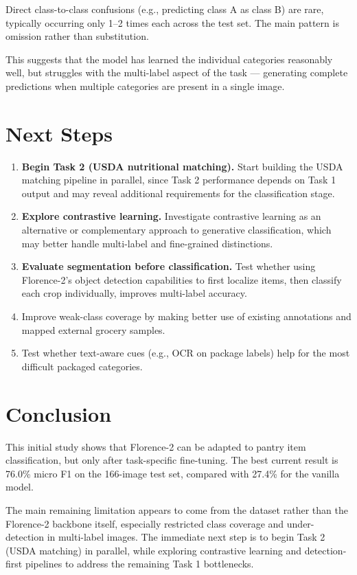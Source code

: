 \documentclass[11pt]{article}
\begin{document}
Direct class-to-class confusions (e.g., predicting class A as class B) are rare, typically occurring only 1--2 times each across the test set. The main pattern is omission rather than substitution.

This suggests that the model has learned the individual categories reasonably well, but struggles with the multi-label aspect of the task --- generating complete predictions when multiple categories are present in a single image.

\section{Next Steps}

\begin{enumerate}[nosep,leftmargin=1.5em]
 \item \textbf{Begin Task 2 (USDA nutritional matching).} Start building the USDA matching pipeline in parallel, since Task 2 performance depends on Task 1 output and may reveal additional requirements for the classification stage.
 \item \textbf{Explore contrastive learning.} Investigate contrastive learning as an alternative or complementary approach to generative classification, which may better handle multi-label and fine-grained distinctions.
 \item \textbf{Evaluate segmentation before classification.} Test whether using Florence-2's object detection capabilities to first localize items, then classify each crop individually, improves multi-label accuracy.
 \item Improve weak-class coverage by making better use of existing annotations and mapped external grocery samples.
 \item Test whether text-aware cues (e.g., OCR on package labels) help for the most difficult packaged categories.
\end{enumerate}

\section{Conclusion}

This initial study shows that Florence-2 can be adapted to pantry item classification, but only after task-specific fine-tuning. The best current result is 76.0\% micro F1 on the 166-image test set, compared with 27.4\% for the vanilla model.

The main remaining limitation appears to come from the dataset rather than the Florence-2 backbone itself, especially restricted class coverage and under-detection in multi-label images. The immediate next step is to begin Task 2 (USDA matching) in parallel, while exploring contrastive learning and detection-first pipelines to address the remaining Task 1 bottlenecks.
\end{document}
